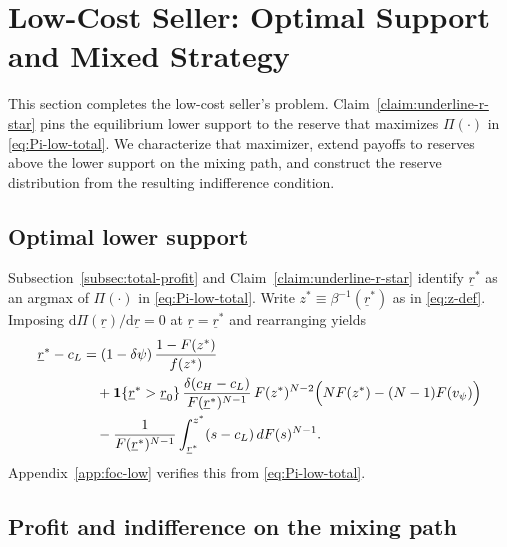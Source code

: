 \section{Low-Cost Seller: Optimal Support and Mixed Strategy}
\label{sec:low-cost-mixed}

This section completes the low-cost seller's problem.
Claim~\ref{claim:underline-r-star} pins the equilibrium lower support to the
reserve that maximizes $\Pi(\cdot)$ in \eqref{eq:Pi-low-total}.
We characterize that maximizer, extend payoffs to reserves above the lower
support on the mixing path, and construct the reserve distribution from the
resulting indifference condition.

\subsection{Optimal lower support}
\label{sec:foc-low}

Subsection~\ref{subsec:total-profit} and Claim~\ref{claim:underline-r-star} identify
$\underline{r}^{*}$ as an argmax of $\Pi(\cdot)$ in \eqref{eq:Pi-low-total}.
Write $z^{*}\equiv\beta^{-1}(\underline{r}^{*})$ as in \eqref{eq:z-def}.
Imposing $\mathrm d\Pi(\underline{r})/\mathrm d\underline{r}=0$ at
$\underline{r}=\underline{r}^{*}$ and rearranging yields
\begin{align}
  \underline{r}^{*} - c_L
  &= (1 - \delta \psi)\,
    \frac{1 - F(z^{*})}{f(z^{*})}
  \label{eq:FOC-low-simplified} \\
  &\quad + \mathbf{1}\{\underline{r}^{*}>\underline{r}_0\}\,
    \frac{\delta (c_H - c_L)}{F(\underline{r}^{*})^{N-1}}\,
    F(z^{*})^{N-2}
    \Bigl(
      N F(z^{*})
      - (N-1) F(v_{\psi})
    \Bigr)
  \notag \\
  &\quad - \frac{1}{F(\underline{r}^{*})^{N-1}}
    \int_{\underline{r}^{*}}^{z^{*}}
      (s - c_L)\, dF(s)^{N-1}.
  \notag
\end{align}
Appendix~\ref{app:foc-low} verifies this from \eqref{eq:Pi-low-total}.

\subsection{Profit and indifference on the mixing path}
\label{sec:profit-above}

